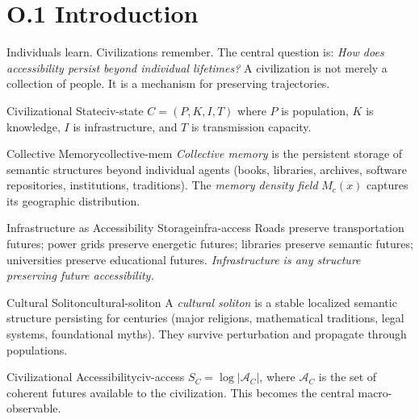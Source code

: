 
\section*{O.1 Introduction}

Individuals learn. Civilizations remember. The central question is:
\emph{How does accessibility persist beyond individual lifetimes?}
A civilization is not merely a collection of people. It is a mechanism
for preserving trajectories.

\begin{definition}{Civilizational State}{civ-state}
  $C = (P, K, I, T)$ where $P$ is population, $K$ is knowledge,
  $I$ is infrastructure, and $T$ is transmission capacity.
\end{definition}

\begin{definition}{Collective Memory}{collective-mem}
  \emph{Collective memory} is the persistent storage of semantic structures
  beyond individual agents (books, libraries, archives, software repositories,
  institutions, traditions). The \emph{memory density field} $M_c(x)$
  captures its geographic distribution.
\end{definition}

\begin{definition}{Infrastructure as Accessibility Storage}{infra-access}
  Roads preserve transportation futures; power grids preserve energetic
  futures; libraries preserve semantic futures; universities preserve
  educational futures. \emph{Infrastructure is any structure preserving
  future accessibility.}
\end{definition}

\begin{definition}{Cultural Soliton}{cultural-soliton}
  A \emph{cultural soliton} is a stable localized semantic structure
  persisting for centuries (major religions, mathematical traditions,
  legal systems, foundational myths). They survive perturbation and
  propagate through populations.
\end{definition}

\begin{definition}{Civilizational Accessibility}{civ-access}
  $S_C = \log |\mathcal{A}_C|$, where $\mathcal{A}_C$ is the set of
  coherent futures available to the civilization. This becomes the
  central macro-observable.
\end{definition}


